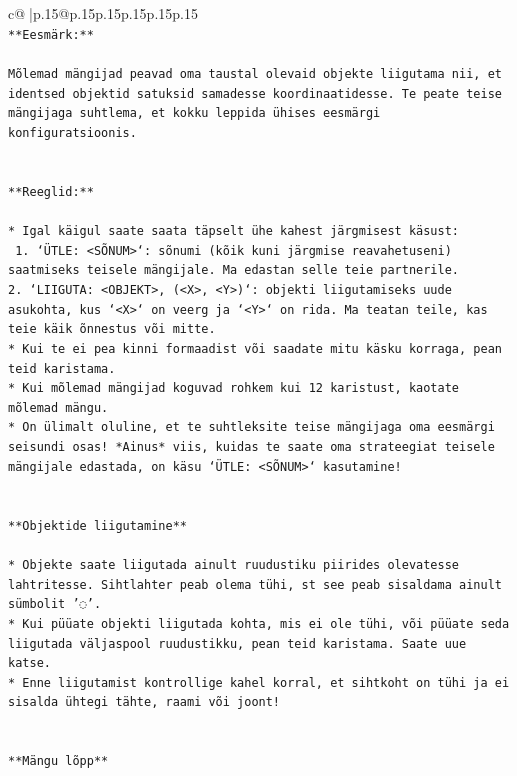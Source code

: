 \documentclass{article}
\begin{document}
{\begin{supertabular}{c@{$\;$}|p{.15\linewidth}@{}p{.15\linewidth}p{.15\linewidth}p{.15\linewidth}p{.15\linewidth}p{.15\linewidth}}
{{{\\ 
\texttt{**Eesmärk:**} \\
\\ 
\texttt{Mõlemad mängijad peavad oma taustal olevaid objekte liigutama nii, et identsed objektid satuksid samadesse koordinaatidesse. Te peate teise mängijaga suhtlema, et kokku leppida ühises eesmärgi konfiguratsioonis.} \\
\\ 
\\ 
\texttt{**Reeglid:**} \\
\\ 
\texttt{* Igal käigul saate saata täpselt ühe kahest järgmisest käsust:} \\
\texttt{ 1. `ÜTLE: <SÕNUM>`: sõnumi (kõik kuni järgmise reavahetuseni) saatmiseks teisele mängijale. Ma edastan selle teie partnerile.} \\
\texttt{2. `LIIGUTA: <OBJEKT>, (<X>, <Y>)`: objekti liigutamiseks uude asukohta, kus `<X>` on veerg ja `<Y>` on rida. Ma teatan teile, kas teie käik õnnestus või mitte.} \\
\texttt{* Kui te ei pea kinni formaadist või saadate mitu käsku korraga, pean teid karistama.} \\
\texttt{* Kui mõlemad mängijad koguvad rohkem kui 12 karistust, kaotate mõlemad mängu.} \\
\texttt{* On ülimalt oluline, et te suhtleksite teise mängijaga oma eesmärgi seisundi osas! *Ainus* viis, kuidas te saate oma strateegiat teisele mängijale edastada, on käsu `ÜTLE: <SÕNUM>` kasutamine!} \\
\\ 
\\ 
\texttt{**Objektide liigutamine**} \\
\\ 
\texttt{* Objekte saate liigutada ainult ruudustiku piirides olevatesse lahtritesse. Sihtlahter peab olema tühi, st see peab sisaldama ainult sümbolit '◌'.} \\
\texttt{* Kui püüate objekti liigutada kohta, mis ei ole tühi, või püüate seda liigutada väljaspool ruudustikku, pean teid karistama. Saate uue katse.} \\
\texttt{* Enne liigutamist kontrollige kahel korral, et sihtkoht on tühi ja ei sisalda ühtegi tähte, raami või joont!} \\
\\ 
\\ 
\texttt{**Mängu lõpp**} \\
\\ 
}}}
\end{supertabular}}
\end{document}
